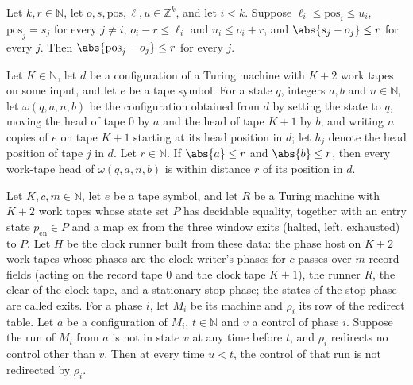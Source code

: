 \begin{lemma}
\label{Turing.cw_box_row}
\leanok
{}
Let $k,r\in\mathbb{N}$, let $o,s,\mathrm{pos},\ell,u\in\mathbb{Z}^k$, and let $i<k$. Suppose
$\ell_i\le\mathrm{pos}_i\le u_i$, $\mathrm{pos}_j=s_j$ for every $j\ne i$, $o_i-r\le\ell_i$ and
$u_i\le o_i+r$, and $\abs{s_j-o_j}\le r$ for every $j$. Then $\abs{\mathrm{pos}_j-o_j}\le r$
for every $j$.
\end{lemma}

\begin{lemma}
\label{Turing.cw_cfg_box}
\leanok
{}
Let $K\in\mathbb{N}$, let $d$ be a configuration of a Turing machine with $K+2$ work tapes on
some input, and let $e$ be a tape symbol. For a state $q$, integers $a,b$ and $n\in\mathbb{N}$,
let $\omega(q,a,n,b)$ be the configuration obtained from $d$ by setting the state to $q$,
moving the head of tape $0$ by $a$ and the head of tape $K+1$ by $b$, and writing $n$ copies of
$e$ on tape $K+1$ starting at its head position in $d$; let $h_j$ denote the head position of
tape $j$ in $d$. Let $r\in\mathbb{N}$. If $\abs{a}\le r$ and $\abs{b}\le r$, then every
work-tape head of $\omega(q,a,n,b)$ is within distance $r$ of its position in $d$.
\end{lemma}

\begin{lemma}
\label{Turing.cw_guard}
\leanok
{}
Let $K,c,m\in\mathbb{N}$, let $e$ be a tape symbol, and let $R$ be a Turing machine with $K+2$
work tapes whose state set $P$ has decidable equality, together with an entry state
$p_{\mathrm{en}}\in P$ and a map $\mathrm{ex}$ from the three window exits (halted, left,
exhausted) to $P$. Let $H$ be the clock runner built from these data: the phase host on $K+2$
work tapes whose phases are the clock writer's phases for $c$ passes over $m$ record fields
(acting on the record tape $0$ and the clock tape $K+1$), the runner $R$, the clear of the
clock tape, and a stationary stop phase; the states of the stop phase are called exits. For a
phase $i$, let $M_i$ be its machine and $\rho_i$ its row of the redirect table. Let $a$ be a
configuration of $M_i$, $t\in\mathbb{N}$ and $v$ a control of phase $i$. Suppose the run of
$M_i$ from $a$ is not in state $v$ at any time before $t$, and $\rho_i$ redirects no control
other than $v$. Then at every time $u<t$, the control of that run is not redirected by
$\rho_i$.
\end{lemma}

